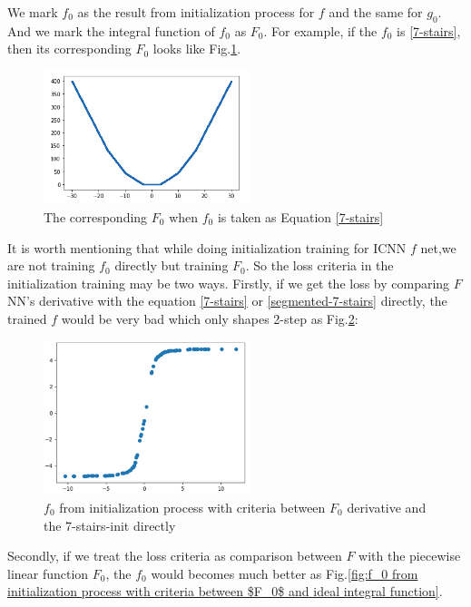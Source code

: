 \documentclass[conference,compsoc]{IEEEtran}
\begin{document}
We mark $f_0$ as the result from initialization process for $f$ and the same for $g_0$. And we mark the integral function of $f_0$ as $F_0$. For example, if the $f_0$ is \eqref{7-stairs}, then its corresponding $F_0$ looks like Fig.\ref{fig:The corresponding $F_0$ when $f_0$ is taken as Equation}.
\begin{figure}[htp]
  \centering
  \includegraphics[width=6cm]{images/piecewise_linear.png}
  \caption{The corresponding $F_0$ when $f_0$ is taken as Equation \eqref{7-stairs}}
  \label{fig:The corresponding $F_0$ when $f_0$ is taken as Equation}
\end{figure}

It is worth mentioning that while doing initialization training for ICNN $f$ net,we are not training $f_0$ directly but training $F_0$. So the loss criteria in the initialization training may be two ways. Firstly, if we get the loss by comparing $F$ NN's derivative with the equation \eqref{7-stairs} or \eqref{segmented-7-stairs} directly, the trained $f$ would be very bad which only shapes 2-step as Fig.\ref{fig:$f_0$ from initialization process with criteria between $F_0$ derivative and the 7-stairs-init directly}:

\begin{figure}[htp]
  \centering
  \includegraphics[width=6cm]{images/f_ICNN_withoutInit.png}
  \caption{$f_0$ from initialization process with criteria between $F_0$ derivative and the 7-stairs-init directly}
  \label{fig:$f_0$ from initialization process with criteria between $F_0$ derivative and the 7-stairs-init directly}
\end{figure}

Secondly, if we treat the loss criteria as comparison between $F$ with the piecewise linear function $F_0$, the $f_0$ would becomes much better as Fig.\ref{fig:f_0 from initialization process with criteria between $F_0$ and ideal integral function}.
\end{document}
